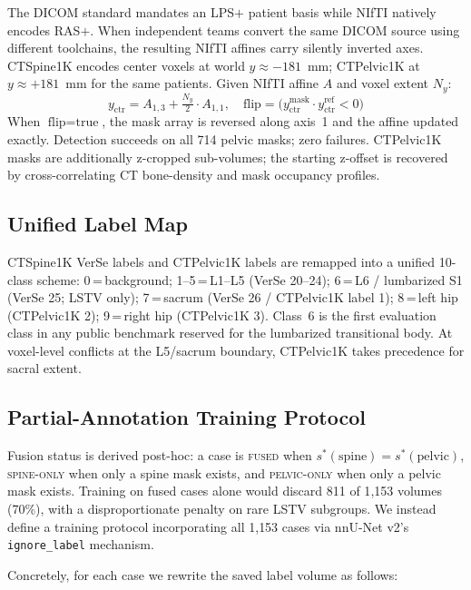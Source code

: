 \documentclass[pmlr]{jmlr}
\begin{document}
The DICOM standard mandates an LPS$+$ patient basis while NIfTI
natively encodes RAS$+$.
When independent teams convert the same DICOM source using different
toolchains, the resulting NIfTI affines carry silently inverted axes.
CTSpine1K encodes center voxels at world $y \approx -181$~mm;
CTPelvic1K at $y \approx +181$~mm for the same patients.
Given NIfTI affine $A$ and voxel extent $N_y$:
\begin{equation}
y_\text{ctr} = A_{1,3} + \tfrac{N_y}{2} \cdot A_{1,1},
\quad
\text{flip} = \bigl(y_\text{ctr}^\text{mask} \cdot
  y_\text{ctr}^\text{ref} < 0\bigr)
\end{equation}
When $\text{flip}=\text{true}$, the mask array is reversed along
axis~1 and the affine updated exactly.
Detection succeeds on all 714 pelvic masks; zero failures.
CTPelvic1K masks are additionally z-cropped sub-volumes; the
starting z-offset is recovered by cross-correlating CT bone-density
and mask occupancy profiles.

\subsection{Unified Label Map}
\label{sec:labels}

CTSpine1K VerSe labels and CTPelvic1K labels are remapped into a
unified 10-class scheme: 0\,=\,background; 1--5\,=\,L1--L5
(VerSe 20--24); 6\,=\,L6 / lumbarized S1 (VerSe 25; LSTV only);
7\,=\,sacrum (VerSe 26 / CTPelvic1K label 1); 8\,=\,left hip
(CTPelvic1K 2); 9\,=\,right hip (CTPelvic1K 3).
Class~6 is the first evaluation class in any public benchmark
reserved for the lumbarized transitional body.
At voxel-level conflicts at the L5/sacrum boundary, CTPelvic1K
takes precedence for sacral extent.

\subsection{Partial-Annotation Training Protocol}
\label{sec:ignore_label}

Fusion status is derived post-hoc: a case is \textsc{fused} when
$s^*(\text{spine}) = s^*(\text{pelvic})$, \textsc{spine-only} when
only a spine mask exists, and \textsc{pelvic-only} when only a
pelvic mask exists.
Training on fused cases alone would discard 811 of 1{,}153 volumes
(70\%), with a disproportionate penalty on rare LSTV subgroups.
We instead define a training protocol incorporating all 1{,}153
cases via nnU-Net v2's \texttt{ignore\_label} mechanism.

Concretely, for each case we rewrite the saved label volume as
follows:
\end{document}

